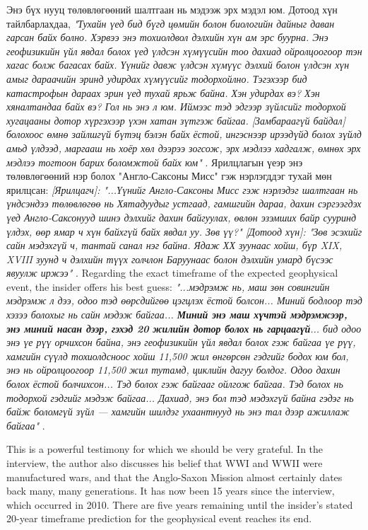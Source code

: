 \documentclass[10pt,twocolumn,letterpaper]{article}
\begin{document}
Энэ бүх нууц төлөвлөгөөний шалтгаан нь мэдээж эрх мэдэл юм. Дотоод хүн тайлбарлахдаа, \textit{"Тухайн үед бид бүгд цөмийн болон биологийн дайныг даван гарсан байх болно. Хэрвээ энэ тохиолдвол дэлхийн хүн ам эрс буурна. Энэ геофизикийн үйл явдал болох үед үлдсэн хүмүүсийн тоо дахиад ойролцоогоор тэн хагас болж багасах байх. Үүнийг давж үлдсэн хүмүүс дэлхий болон үлдсэн хүн амыг дараачийн эринд удирдах хүмүүсийг тодорхойлно. Тэгэхээр бид катастрофын дараах эрин үед тухай ярьж байна. Хэн удирдах вэ? Хэн хяналтандаа байх вэ? Гол нь энэ л юм. Иймээс тэд эдгээр зүйлсийг тодорхой хугацааны дотор хүргэхээр үхэн хатан зүтгэж байгаа. [Замбараагүй байдал] болохоос өмнө зайлшгүй бүтэц бэлэн байх ёстой, ингэснээр ирээдүйд болох зүйлд амьд үлдээд, маргааш нь хоёр хөл дээрээ зогсож, эрх мэдлээ хадгалж, өмнөх эрх мэдлээ тогтоон барих боломжтой байх юм"} \cite{4}. Ярилцлагын үеэр энэ төлөвлөгөөний нэр болох "Англо-Саксоны Мисс" гэж нэрлэгддэг тухай мөн ярилцсан: \textit{[Ярилцагч]: "...Үүнийг Англо-Саксоны Мисс гэж нэрлэдэг шалтгаан нь үндсэндээ төлөвлөгөө нь Хятадуудыг устгаад, гамшгийн дараа, дахин сэргээгдэх үед Англо-Саксонууд шинэ дэлхийг дахин байгуулах, өвлөн эзэмших байр сууринд үлдэх, өөр ямар ч хүн байхгүй байх явдал уу. Зөв үү?" [Дотоод хүн]: "Зөв эсэхийг сайн мэдэхгүй ч, тантай санал нэг байна. Ядаж ХХ зуунаас хойш, бүр XIX, XVIII зуунд ч дэлхийн түүх голчлон Баруунаас болон дэлхийн умард бүсээс явуулж иржээ"} \cite{4}.
Regarding the exact timeframe of the expected geophysical event, the insider offers his best guess: \textit{"...мэдрэмж нь, маш зөн совингийн мэдрэмж л дээ, одоо тэд өөрсдийгөө цэгцлэх ёстой болсон... Миний бодлоор тэд хэзээ болохыг нь сайн мэдэж байгаа... \textbf{Миний энэ маш хүчтэй мэдрэмжээр, энэ миний насан дээр, гэхэд 20 жилийн дотор болох нь гарцаагүй}... бид одоо энэ үе рүү орчихсон байна, энэ геофизикийн үйл явдал болох гэж байгаа үе рүү, хамгийн сүүлд тохиолдсноос хойш 11,500 жил өнгөрсөн гэдгийг бодох юм бол, энэ нь ойролцоогоор 11,500 жил тутамд, циклийн дагуу болдог. Одоо дахин болох ёстой болчихсон... Тэд болох гэж байгааг ойлгож байгаа. Тэд болох нь тодорхой гэдгийг мэдэж байгаа... Дахиад, энэ бол тэд мэдэхгүй байна гэдэг нь байж боломгүй зүйл — хамгийн шилдэг ухаантнууд нь энэ тал дээр ажиллаж байгаа"} \cite{4}.

This is a powerful testimony for which we should be very grateful. In the interview, the author also discusses his belief that WWI and WWII were manufactured wars, and that the Anglo-Saxon Mission almost certainly dates back many, many generations. It has now been 15 years since the interview, which occurred in 2010. There are five years remaining until the insider's stated 20-year timeframe prediction for the geophysical event reaches its end.
\end{document}
